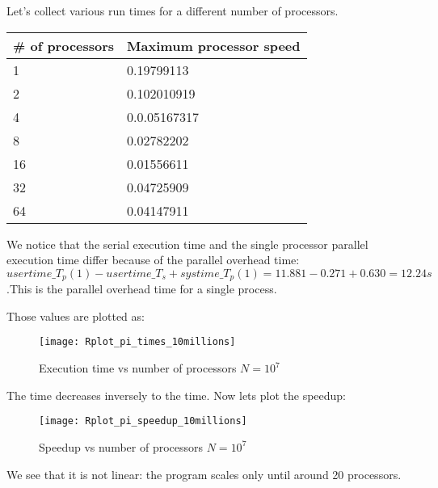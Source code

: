 \documentclass[11pt]{scrartcl} %
\begin{document}
Let's collect various run times for a different number of processors. 
\begin{adjustwidth}{2cm}{}
	\begin{tabular}[h]{l|l }
		\hline
			\# of processors&Maximum processor speed\\
			\hline
			1&0.19799113\\
			2&0.102010919\\
			4&0.0.05167317\\
			8&0.02782202\\
			16&0.01556611\\
			32&0.04725909\\
			64&0.04147911\\
		\end{tabular}
	\end{adjustwidth}
We notice that the serial execution time and the single processor parallel execution time differ because of the parallel overhead time: $usertime\_T_p(1)-usertime\_T_s+systime\_T_p(1)= 11.881-0.271+ 0.630= 12.24 s$ .This is the parallel overhead time for a single process.

Those values are plotted as:
\begin{figure}[H] %
	\centering
	\texttt{[image: Rplot\_pi\_times\_10millions]} %
	\caption{Execution time vs number of processors $N = 10^7$ }
\end{figure}

The time decreases inversely to the time. Now lets plot the speedup: 
\begin{figure}[H] %
	\centering
	\texttt{[image: Rplot\_pi\_speedup\_10millions]} %
	\caption{Speedup vs number of processors $N=10^7$}
\end{figure}
We see that it is not linear: the program scales only until around 20 processors.
\end{document}
